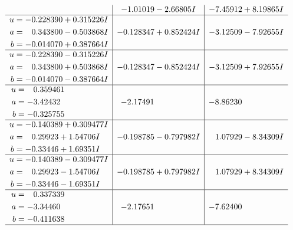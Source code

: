 \documentclass[1p]{elsarticle_modified}
\theoremstyle{definition}
\begin{document}
$$\begin{array}{c|c|c}
 & -1.01019 - 2.66805 I & -7.45912 + 8.19865 I \\ \hline\begin{aligned}
u &= -0.228390 + 0.315226 I \\
a &= \phantom{-}0.343800 - 0.503868 I \\
b &= -0.014070 + 0.387664 I\end{aligned}
 & -0.128347 + 0.852424 I & -3.12509 - 7.92655 I \\ \hline\begin{aligned}
u &= -0.228390 - 0.315226 I \\
a &= \phantom{-}0.343800 + 0.503868 I \\
b &= -0.014070 - 0.387664 I\end{aligned}
 & -0.128347 - 0.852424 I & -3.12509 + 7.92655 I \\ \hline\begin{aligned}
u &= \phantom{-}0.359461\phantom{ +0.000000I} \\
a &= -3.42432\phantom{ +0.000000I} \\
b &= -0.325755\phantom{ +0.000000I}\end{aligned}
 & -2.17491\phantom{ +0.000000I} & -8.86230\phantom{ +0.000000I} \\ \hline\begin{aligned}
u &= -0.140389 + 0.309477 I \\
a &= \phantom{-}0.29923 + 1.54706 I \\
b &= -0.33446 + 1.69351 I\end{aligned}
 & -0.198785 - 0.797982 I & \phantom{-}1.07929 - 8.34309 I \\ \hline\begin{aligned}
u &= -0.140389 - 0.309477 I \\
a &= \phantom{-}0.29923 - 1.54706 I \\
b &= -0.33446 - 1.69351 I\end{aligned}
 & -0.198785 + 0.797982 I & \phantom{-}1.07929 + 8.34309 I \\ \hline\begin{aligned}
u &= \phantom{-}0.337339\phantom{ +0.000000I} \\
a &= -3.34460\phantom{ +0.000000I} \\
b &= -0.411638\phantom{ +0.000000I}\end{aligned}
 & -2.17651\phantom{ +0.000000I} & -7.62400\phantom{ +0.000000I}\\
 \hline 
 \end{array}$$\newpage\newpage\renewcommand{\arraystretch}{1}
\end{document}
